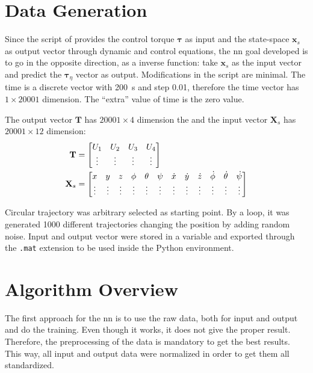 \section{Data Generation}

Since the script of \citet{geronel2023} provides the control torque \(\mathbf{\tau}\) as input and the state-space \(\mathbf{x}_s\) as output vector through dynamic and control equations, the \gls*{nn} goal developed is to go in the opposite direction, as a inverse function: take \(\mathbf{x}_s\) as the input vector and predict the \(\mathbf{\tau}_{\eta}\) vector as output.
Modifications in the script are minimal.
The time is a discrete vector with \SI{200}{s} and step 0.01, therefore the time vector has \(1\times 20001\) dimension.
The ``extra'' value of time is the zero value.

The output vector \(\mathbf{T}\) has \(20001\times 4\) dimension the and the input vector \(\mathbf{X}_s\) has  \(20001\times 12\) dimension:
%
\begin{align}
    \mathbf{T} &= \begin{bmatrix}
        U_1 & U_2 & U_3 & U_4 \\
        \vdots       & \vdots       & \vdots       & \vdots  \\
    \end{bmatrix} 
    \label{eq:tau_input} \\
    \setcounter{MaxMatrixCols}{13}
    \mathbf{X}_s &=
    \begin{bmatrix}
        x&y&z&\phi&\theta&\psi&\dot{x}&\dot{y}&\dot{z}&\dot{\phi}&\dot{\theta}&\dot{\psi} \\
        \vdots & \vdots & \vdots & \vdots & \vdots & \vdots & \vdots & \vdots & \vdots & \vdots & \vdots & \vdots 
    \end{bmatrix}
    \label{eq:xs_output}
\end{align}

Circular trajectory was arbitrary selected as starting point.
By a loop, it was generated 1000 different trajectories changing the position  by adding random noise.
Input and output vector were stored in a \matlab variable and exported through the \texttt{.mat} extension to be used inside the Python environment.

\section{Algorithm Overview}

The first approach for the \gls*{nn} is to use the raw data, both for input and output and do the training.
Even though it works, it does not give the proper result.
Therefore, the preprocessing of the data is mandatory to get the best results.
This way, all input and output data were normalized in order to get them all standardized.

